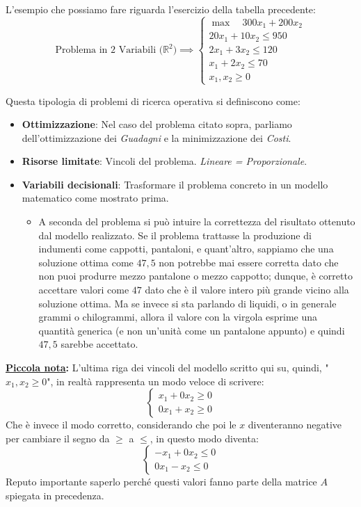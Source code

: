 \documentclass[12pt, a4paper]{article}
\begin{document}
	\vspace{0.4cm}
	L'esempio che possiamo fare riguarda l'esercizio della tabella precedente:
	\[
	\text{Problema in 2 Variabili ($\mathbb{R}^2$)} \implies 
	\begin{cases}
		\max \quad 300x_1 + 200x_2 \\
		20x_1 + 10x_2 \leq 950 \\
		2x_1 + 3x_2 \leq 120 \\
		x_1 + 2x_2 \leq 70 \\
		x_{1}, x_{2} \geq 0
	\end{cases}
	\]
	
	Questa tipologia di problemi di ricerca operativa si definiscono come:
	\begin{itemize}[label=\textcolor{titlecolor}{\Large\textbullet}, itemsep=4pt, leftmargin=1.5cm]
		\item \textbf{Ottimizzazione}: Nel caso del problema citato sopra, parliamo dell'ottimizzazione dei \textit{Guadagni} e la minimizzazione dei \textit{Costi}.
		\item \textbf{Risorse limitate}: Vincoli del problema. \textit{Lineare = Proporzionale}.
		\item \textbf{Variabili decisionali}: Trasformare il problema concreto in un modello matematico come mostrato prima.
		\begin{itemize}[label=$\circ$, itemsep=2pt]
			\item A seconda del problema si può intuire la correttezza del risultato ottenuto dal modello realizzato. Se il problema trattasse la produzione di indumenti come cappotti, pantaloni, e quant'altro, sappiamo che una soluzione ottima come $47,5$ non potrebbe mai essere corretta dato che non puoi produrre mezzo pantalone o mezzo cappotto; dunque, è corretto accettare valori come $47$ dato che è il valore intero più grande vicino alla soluzione ottima. Ma se invece si sta parlando di liquidi, o in generale grammi o chilogrammi, allora il valore con la virgola esprime una quantità generica (e non un'unità come un pantalone appunto) e quindi $47,5$ sarebbe accettato.
		\end{itemize}
	\end{itemize}
	
	\textbf{\underline{Piccola nota}:} L'ultima riga dei vincoli del modello scritto qui su, quindi, "$x_{1}, x_{2} \geq 0$", in realtà rappresenta un modo veloce di scrivere:
	\[
	\begin{cases}
		x_1 + 0x_2 \geq 0 \\
		0x_1 + x_2 \geq 0
	\end{cases}
	\]
	Che è invece il modo corretto, considerando che poi le $x$ diventeranno negative per cambiare il segno da $\geq$ a $\leq$, in questo modo diventa:
	\[
	\begin{cases}
		-x_1 + 0x_2 \leq 0 \\
		0x_1 - x_2 \leq 0
	\end{cases}
	\]
	Reputo importante saperlo perché questi valori fanno parte della matrice $A$ spiegata in precedenza.
	
\end{document}
